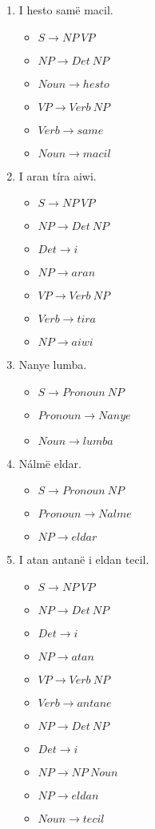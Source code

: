 \begin{enumerate}
  \item I hesto samë macil. 
    \begin{itemize}
      \item $S \to NP\ VP$ 
      \item $NP \to Det\ NP$
      \item $Noun \to hesto$ 
      \item $VP \to Verb\ NP$ 
      \item $Verb \to same$
      \item $Noun \to macil$
    \end{itemize}
  \item I aran tíra aiwi. 
    \begin{itemize}
      \item $S \to NP\ VP$ 
      \item $NP \to Det\ NP$ 
      \item $Det \to i$ 
      \item $NP \to aran$ 
      \item $VP \to Verb\ NP$
      \item $Verb \to tira$ 
      \item $NP \to aiwi$
    \end{itemize}
  \item Nanye lumba.
    \begin{itemize}
      \item $S \to Pronoun\ NP$
      \item $Pronoun \to Nanye$ 
      \item $Noun \to lumba$
    \end{itemize}
  \item Nálmë eldar. 
    \begin{itemize}
      \item $S \to Pronoun\ NP$ 
      \item $Pronoun \to Nalme$
      \item $NP \to eldar$
    \end{itemize}
  \item I atan antanë i eldan tecil.
    \begin{itemize}
      \item $S \to NP\ VP$
      \item $NP \to Det\ NP$
      \item $Det \to i$
      \item $NP \to atan$
      \item $VP \to Verb\ NP$
      \item $Verb \to antane$
      \item $NP \to Det\ NP$
      \item $Det \to i$
      \item $NP \to NP\ Noun$
      \item $NP \to eldan$
      \item $Noun \to tecil$
    \end{itemize}
\end{enumerate}

